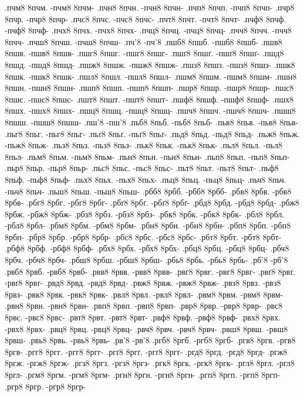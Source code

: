 {.пчм8 8пчм. -пчм8 8пчм-
.пчн8 8пчн. -пчн8 8пчн-
.пчп8 8пчп. -пчп8 8пчп-
.пчр8 8пчр. -пчр8 8пчр-
.пчс8 8пчс. -пчс8 8пчс-
.пчт8 8пчт. -пчт8 8пчт-
.пчф8 8пчф. -пчф8 8пчф-
.пчх8 8пчх. -пчх8 8пчх-
.пчц8 8пчц. -пчц8 8пчц-
.пчч8 8пчч. -пчч8 8пчч-
.пчш8 8пчш. -пчш8 8пчш-
.пч'8 -пч'8
.пшб8 8пшб. -пшб8 8пшб-
.пшв8 8пшв. -пшв8 8пшв-
.пшг8 8пшг. -пшг8 8пшг-
.пшґ8 8пшґ. -пшґ8 8пшґ-
.пшд8 8пшд. -пшд8 8пшд-
.пшж8 8пшж. -пшж8 8пшж-
.пшз8 8пшз. -пшз8 8пшз-
.пшк8 8пшк. -пшк8 8пшк-
.пшл8 8пшл. -пшл8 8пшл-
.пшм8 8пшм. -пшм8 8пшм-
.пшн8 8пшн. -пшн8 8пшн-
.пшп8 8пшп. -пшп8 8пшп-
.пшр8 8пшр. -пшр8 8пшр-
.пшс8 8пшс. -пшс8 8пшс-
.пшт8 8пшт. -пшт8 8пшт-
.пшф8 8пшф. -пшф8 8пшф-
.пшх8 8пшх. -пшх8 8пшх-
.пшц8 8пшц. -пшц8 8пшц-
.пшч8 8пшч. -пшч8 8пшч-
.пшш8 8пшш. -пшш8 8пшш-
.пш'8 -пш'8
.пьб8 8пьб. -пьб8 8пьб-
.пьв8 8пьв. -пьв8 8пьв-
.пьг8 8пьг. -пьг8 8пьг-
.пьґ8 8пьґ. -пьґ8 8пьґ-
.пьд8 8пьд. -пьд8 8пьд-
.пьж8 8пьж. -пьж8 8пьж-
.пьз8 8пьз. -пьз8 8пьз-
.пьк8 8пьк. -пьк8 8пьк-
.пьл8 8пьл. -пьл8 8пьл-
.пьм8 8пьм. -пьм8 8пьм-
.пьн8 8пьн. -пьн8 8пьн-
.пьп8 8пьп. -пьп8 8пьп-
.пьр8 8пьр. -пьр8 8пьр-
.пьс8 8пьс. -пьс8 8пьс-
.пьт8 8пьт. -пьт8 8пьт-
.пьф8 8пьф. -пьф8 8пьф-
.пьх8 8пьх. -пьх8 8пьх-
.пьц8 8пьц. -пьц8 8пьц-
.пьч8 8пьч. -пьч8 8пьч-
.пьш8 8пьш. -пьш8 8пьш-
.рбб8 8рбб. -рбб8 8рбб-
.рбв8 8рбв. -рбв8 8рбв-
.рбг8 8рбг. -рбг8 8рбг-
.рбґ8 8рбґ. -рбґ8 8рбґ-
.рбд8 8рбд. -рбд8 8рбд-
.рбж8 8рбж. -рбж8 8рбж-
.рбз8 8рбз. -рбз8 8рбз-
.рбк8 8рбк. -рбк8 8рбк-
.рбл8 8рбл. -рбл8 8рбл-
.рбм8 8рбм. -рбм8 8рбм-
.рбн8 8рбн. -рбн8 8рбн-
.рбп8 8рбп. -рбп8 8рбп-
.рбр8 8рбр. -рбр8 8рбр-
.рбс8 8рбс. -рбс8 8рбс-
.рбт8 8рбт. -рбт8 8рбт-
.рбф8 8рбф. -рбф8 8рбф-
.рбх8 8рбх. -рбх8 8рбх-
.рбц8 8рбц. -рбц8 8рбц-
.рбч8 8рбч. -рбч8 8рбч-
.рбш8 8рбш. -рбш8 8рбш-
.рбь8 8рбь. -рбь8 8рбь-
.рб'8 -рб'8
.рвб8 8рвб. -рвб8 8рвб-
.рвв8 8рвв. -рвв8 8рвв-
.рвг8 8рвг. -рвг8 8рвг-
.рвґ8 8рвґ. -рвґ8 8рвґ-
.рвд8 8рвд. -рвд8 8рвд-
.рвж8 8рвж. -рвж8 8рвж-
.рвз8 8рвз. -рвз8 8рвз-
.рвк8 8рвк. -рвк8 8рвк-
.рвл8 8рвл. -рвл8 8рвл-
.рвм8 8рвм. -рвм8 8рвм-
.рвн8 8рвн. -рвн8 8рвн-
.рвп8 8рвп. -рвп8 8рвп-
.рвр8 8рвр. -рвр8 8рвр-
.рвс8 8рвс. -рвс8 8рвс-
.рвт8 8рвт. -рвт8 8рвт-
.рвф8 8рвф. -рвф8 8рвф-
.рвх8 8рвх. -рвх8 8рвх-
.рвц8 8рвц. -рвц8 8рвц-
.рвч8 8рвч. -рвч8 8рвч-
.рвш8 8рвш. -рвш8 8рвш-
.рвь8 8рвь. -рвь8 8рвь-
.рв'8 -рв'8
.ргб8 8ргб. -ргб8 8ргб-
.ргв8 8ргв. -ргв8 8ргв-
.ргг8 8ргг. -ргг8 8ргг-
.ргґ8 8ргґ. -ргґ8 8ргґ-
.ргд8 8ргд. -ргд8 8ргд-
.ргж8 8ргж. -ргж8 8ргж-
.ргз8 8ргз. -ргз8 8ргз-
.ргк8 8ргк. -ргк8 8ргк-
.ргл8 8ргл. -ргл8 8ргл-
.ргм8 8ргм. -ргм8 8ргм-
.ргн8 8ргн. -ргн8 8ргн-
.ргп8 8ргп. -ргп8 8ргп-
.ргр8 8ргр. -ргр8 8ргр-
}
